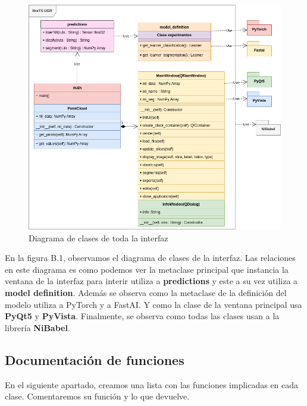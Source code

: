 \begin{figure}[H]
	\centering
	\includegraphics[width=1.0\linewidth]{imagenes/diagrama_interfaz.png}
	\caption{Diagrama de clases de toda la interfaz}
\end{figure}

En la figura B.1, observamos el diagrama de clases de la interfaz. Las relaciones en este diagrama es como podemos ver la metaclase principal que instancia la ventana de la interfaz para interir utiliza a \textbf{predictions} y este a su vez utiliza a \textbf{model definition}. Además se observa como la metaclase de la definición del modelo utiliza a PyTorch y a FastAI. Y como la clase de la ventana principal usa \textbf{PyQt5} y \textbf{PyVista}. Finalmente, se observa como todas las clases usan a la librería \textbf{NiBabel}.


\subsection{Documentación de funciones}

En el siguiente apartado, creamos una lista con las funciones implicadas en cada clase. Comentaremos su función y lo que devuelve.

